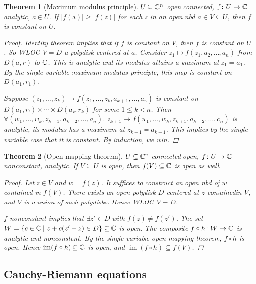 \documentclass[A4paper, british, reqno]{amsart}
\theoremstyle{darkgreentheorem}
\newtheorem{thm}{Theorem}[section]
\theoremstyle{darkbluedefinition}
\theoremstyle{darkredexample}
\theoremstyle{remark}
\DeclareMathOperator{\im}{im}
\newcommand{\1}{\mathbbm{1}}
\begin{document}
\begin{thm}[Maximum modulus principle]
    $U\subseteq \mathbb{C}^{n}$ open connected, $f\colon U\to \mathbb{C}$ analytic, $a\in U$.
    If $|f(a)|\geqslant |f(z)|$ for each $z$ in an open nbd $a\in V\subseteq U$, then $f$ is constant on $U$.
    \begin{proof}
	Identity theorem implies that if $f$ is constant on $V$, then $f$ is constant on $U$.
	So WLOG $V=D$ a polydisk centered at $a$.
	Consider $z_{1}\mapsto f(z_{1},a_{2},\ldots,a_{n})$ from $D(a,r)$ to $\mathbb{C}$.
	This is analytic and its modulus attains a maximum at $z_{1}=a_{1}$.
	By the single variable maximum modulus principle, this map is constant on $D(a_{1},r_{1})$.
	
	Suppose $(z_{1},\ldots,z_{k})\mapsto f(z_{1},\ldots,z_{k},a_{k+1},\ldots,a_{n})$ is constant on $D(a_{1},r_{!})\times \cdots \times D(a_{k},r_{k})$ for some $1\leqslant k<n$.
	Then $\forall (w_{1},\ldots, w_{k},z_{k+1},a_{k+2},\ldots,a_{n})$, $z_{k+1}\mapsto f(w_{1},\ldots,w_{k},z_{k+1},a_{k+2},\ldots,a_{n})$ is analytic, its modulus has a maximum at $z_{k+1}=a_{k+1}$.
	This implies by the single variable case that it is constant.
	By induction, we win.
    \end{proof}
\end{thm}

\begin{thm}[Open mapping theorem]
    $U\subseteq \mathbb{C}^{n}$ connected open, $f\colon U\to \mathbb{C}$ nonconstant, analytic.
    If $V\subseteq U$ is open, then $f(V)\subseteq \mathbb{C}$ is open as well.
    \begin{proof}
	Let $z\in V$ and $w=f(z)$.
	It suffices to construct an open nbd of $w$ contained in $f(V)$.
	There exists an open polydisk $D$ centered at $z$ containedin $V$, and $V$ is a union of such polydisks.
	Hence WLOG $V=D$.

	$f$ nonconstant implies that $\exists z'\in D$ with $f(z)\neq f(z')$.
	The set $W=\{c\in \mathbb{C}\mid z+c(z'-z)\in D\}\subseteq \mathbb{C} $ is open.
	The composite $f\circ h\colon W\to \mathbb{C}$ is analytic and nonconstant.
	By the single variable open mapping theorem, $f\circ h$ is open.
	Hence $\im(f\circ h)\subseteq \C$ is open, and $\im(f\circ h)\subseteq f(V)$.
    \end{proof}
\end{thm}

\subsection{Cauchy-Riemann equations}
\end{document}
